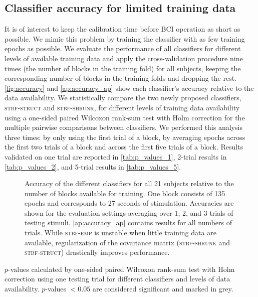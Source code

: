 \begin{refsection}
	\subsection{Classifier accuracy for limited training data}
	It is of interest to keep the calibration time before BCI
	operation as short as possible.
	We mimic this problem by training the classifier with as few training epochs as possible.
	We evaluate the performance of all classifiers for different levels of
	available training data and apply the cross-validation procedure nine times (the number of blocks in the training fold) for all subjects, keeping the
	corresponding number of blocks in the training folds and dropping the rest.
	\autoref{fig:accuracy} and \autoref{ap:accuracy_ap} show each classifier's
	accuracy relative to the data availability.
	We statistically compare the two newly proposed classifiers,
	\textsc{stbf-struct} and \textsc{stbf-shrunk}, for different levels of training
	data availability using a one-sided paired Wilcoxon rank-sum test with Holm correction for the multiple pairwise comparisons between classifiers.
	We performed this analysis three times: by only using the first trial of a
	block, by averaging epochs across the first two trials of a block and across
	the first five trials of a block.
	Results validated on one trial are reported in \autoref{tab:p_values_1}, 2-trial results
	in \autoref{tab:p_values_2}, and 5-trial results in \autoref{tab:p_values_5}.

	\begin{figure}
		\caption{Accuracy of the different classifiers for all 21 subjects relative to the
			number of blocks available for training. One block consists of 135
			epochs and corresponds to 27 seconds of stimulation. Accuracies
			are shown for the evaluation settings averaging over 1, 2, and
			3 trials of testing stimuli.
			\autoref{ap:accuracy_ap} contains results for all numbers of trials.
			While \textsc{stbf-emp} is unstable when little training data
			are available,
			regularization of the covariance matrix (\textsc{stbf-shrunk} and
			\textsc{stbf-struct}) drastically improves performance.}
		\label{fig:accuracy}
	\end{figure}
	\begin{table}[h]
		\centering
		
		\caption{$p$-values calculated by one-sided paired Wilcoxon rank-sum test with
			Holm correction using one testing trial for different classifiers
			and levels of data availability. $p$-values $<0.05$ are considered significant
			and marked in grey.}
		\label{tab:p_values_1}


\end{table}
\end{refsection}
